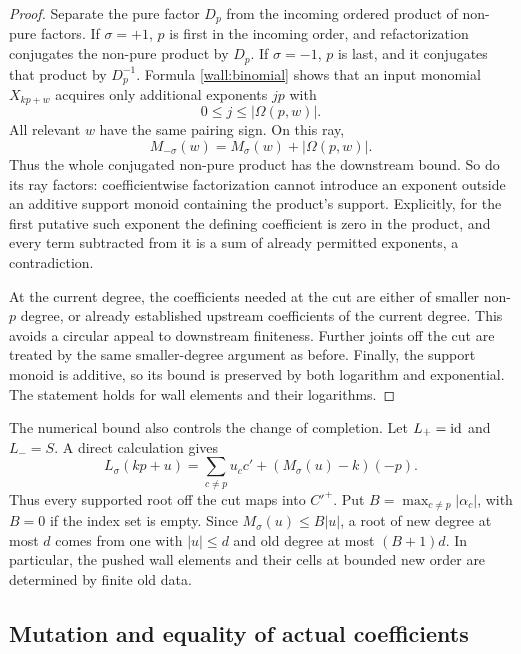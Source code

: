 \begin{proof}
Separate the pure factor $D_p$ from the incoming ordered
product of non-pure factors.  If $\sigma=+1$, $p$ is first
in the incoming order, and refactorization conjugates the
non-pure product by $D_p$.  If $\sigma=-1$, $p$ is last,
and it conjugates that product by $D_p^{-1}$.  Formula
\eqref{wall:binomial} shows that an input monomial $X_{kp+w}$
acquires only additional exponents $jp$ with
\[
 0\le j\le |\Omega(p,w)|.
\]
All relevant $w$ have the same pairing sign.  On this ray,
\[
 M_{-\sigma}(w)=M_\sigma(w)+|\Omega(p,w)|.
\]
Thus the whole conjugated non-pure product has the downstream
bound.  So do its ray factors: coefficientwise factorization
cannot introduce an exponent outside an additive support
monoid containing the product's support.  Explicitly, for the
first putative such exponent the defining coefficient is zero
in the product, and every term subtracted from it is a sum of
already permitted exponents, a contradiction.

At the current degree, the coefficients needed at the cut
are either of smaller non-$p$ degree, or already established
upstream coefficients of the current degree.  This avoids a
circular appeal to downstream finiteness.  Further joints
off the cut are treated by the same smaller-degree argument
as before.  Finally, the support monoid is additive, so its
bound is preserved by both logarithm and exponential.  The
statement holds for wall elements and their logarithms.
\end{proof}

The numerical bound also controls the change of completion.
Let $L_+=\operatorname{id}$ and $L_-=S$.  A direct calculation gives
\begin{equation}
 L_\sigma(kp+u)
 =\sum_{c\ne p}u_cc'+(M_\sigma(u)-k)(-p).
 \label{wall:root-image}
\end{equation}
Thus every supported root off the cut maps into $C'^+$.
Put $B=\max_{c\ne p}|\alpha_c|$, with $B=0$ if the index
set is empty.  Since $M_\sigma(u)\le B|u|$, a root of new
degree at most $d$ comes from one with $|u|\le d$ and old
degree at most $(B+1)d$.  In particular, the pushed wall
elements and their cells at bounded new order are determined
by finite old data.

\subsection{Mutation and equality of actual coefficients}

